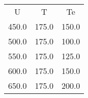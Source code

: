 \begin{table}
\begin{tabular}{ccc}
U & T & Te \\
450.0 & 175.0 & 150.0 \\
500.0 & 175.0 & 100.0 \\
550.0 & 175.0 & 125.0 \\
600.0 & 175.0 & 150.0 \\
650.0 & 175.0 & 200.0 \\
\end{tabular}
\end{table}
